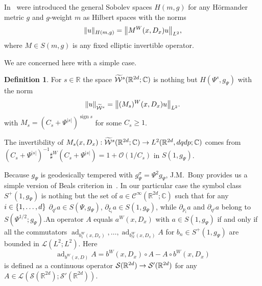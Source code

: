 \documentclass[10pt]{amsart}
\theoremstyle{definition}\newtheorem{defi}[theo]{Definition}\newtheorem{rema}[theo]{Remark}\newtheorem{exam}[theo]{Example}\newtheorem{exem}[theo]{Example}\newtheorem{nota}[theo]{Notation}
\newcommand{\C}{\mathbb{C}}
\newcommand{\R}{\mathbb{R}}
\newcommand{\clW}{\mathcal{W}}
\newcommand{\clC}{\mathcal{C}}
\newcommand{\clO}{\mathcal{O}}
\newcommand{\clS}{\mathcal{S}}
\newcommand{\clL}{\mathcal{L}}
\DeclareMathOperator{\ssign}{sign}
\DeclareMathOperator{\add}{ad}
\let\oldtilde\tilde
\renewcommand*{\tilde}[1]{\mathchoice{\widetilde{#1}}{\widetilde{#1}}{\oldtilde{#1}}{\oldtilde{#1}}}
\let\originalleft\left
\let\originalright\right
\renewcommand{\left}{\mathopen{}\mathclose\bgroup\originalleft}
\renewcommand{\right}{\aftergroup\egroup\originalright}
\renewcommand*{\to}{\mathchoice{\longrightarrow}{\rightarrow}{\rightarrow}{\rightarrow}}
\begin{document}
In~\cite{BoCh} were introduced the general Sobolev spaces $H(m,g)$ for any H\"ormander metric $g$ and $g$-weight $m$ as Hilbert spaces with the norms
\[
\|u\|_{H(m,g)}=\left\|M^{W}(x,D_{x})u\right\|_{L^{2}},
\]
where $M\in S(m,g)$ is any fixed elliptic invertible operator.

We are concerned here with a simple case.
\begin{defi}\label{de:tWsRd}
For $s\in \R$ the space $\tilde{\clW}^{s}(\R^{2d};\C)$ is nothing but $H(\Psi^{s},g_{\Psi})$ with the norm
\[
\|u\|_{\widetilde{\clW}^{s}}=\left\|(M_{s})^{W}(x,D_{x})u\right\|_{L^{2}}.
\]
with $M_{s}=(C_{s}+\Psi^{|s|})^{\ssign s}$ for some $C_{s}\geq 1$.
\end{defi}

The invertibility of $M_{s}(x,D_{x}):\tilde{\clW}^{s}(\R^{2d};\C)\to L^{2}(\R^{2d},dqdp;\C)$ comes from $(C_{s}+\Psi^{|s|})^{-1}\sharp^{W}(C_{s}+\Psi^{|s|})=1+\clO(1/C_{s})$ in $S(1,g_{\Psi})$.

Because $g_{\Psi}$ is geodesically tempered with $g_{\Psi}^{\sigma}=\Psi^{2}g_{\Psi}$, J.M.~Bony provides us a simple version of Beals criterion in~\cite{Bon}. In our particular case the symbol class $S^{+}(1,g_{\Psi})$ is nothing but the set of $a\in \clC^{\infty}(\R^{2d};\C)$ such that for any $i\in \left\{1,\dots,d\right\}$ $\partial_{q^{i}}a\in S(\Psi,g_{\Psi})$, $\partial_{\xi_{i}}a\in S(1,g_{\Psi})$, while $\partial_{p_{i}}a$ and $\partial_{\eta^{i}}a$ belong to $S(\Psi^{1/2};g_{\Psi})$.\linebreak An operator $A$ equals $a^{W}(x,D_{x})$ with $a\in S(1,g_{\Psi})$ if and only if all the commutators $\add_{b_{1}^{W}(x,D_{x})}, \dots, \add_{b_{N}^{W}(x,D_{x})}A$ for $b_{n}\in S^{+}(1,g_{\Psi})$ are bounded in $\clL(L^{2};L^{2})$. Here
\[
\add_{b^{W}(x,D)}A=b^{W}(x,D_{x})\circ A-A\circ b^{W}(x,D_{x})
\]
is defined as a continuous operator $\clS(\R^{2d})\to \clS'(\R^{2d})$ for any $A\in \clL(\clS(\R^{2d});\clS'(\R^{2d}))$.
\end{document}

